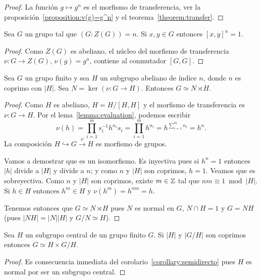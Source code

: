 \begin{proof}
	La función $g\mapsto g^n$ es el morfismo de transferencia, ver la
	proposición~\ref{proposition:v(g)=g^n} y el teorema~\ref{theorem:transfer}.
\end{proof}

\begin{corollary}
	\label{corollary:[x,y]^n=1}
	Sea $G$ un grupo tal que $(G:Z(G))=n$. Si $x,y\in G$ entonces $[x,y]^n=1$. 
\end{corollary}

\begin{proof}
	Como $Z(G)$ es abeliano, el núcleo del morfismo de transferencia $\nu\colon
	G\to Z(G)$, $\nu(g)=g^n$, contiene al conmutador $[G,G]$.
\end{proof}

\begin{corollary}
	\label{corollary:semidirecto}
	Sea $G$ un grupo finito y sea $H$ un subgrupo abeliano de
	índice $n$, donde $n$ es coprimo con $|H|$.  Sea
	$N=\ker(\nu\colon G\to H)$. Entonces $G\simeq N\rtimes H$.
\end{corollary}

\begin{proof}
	Como $H$ es abeliano, $H=H/[H,H]$ y el morfismo de transferencia es
	$\nu\colon G\to H$. Por el lema~\ref{lemma:evaluation}, podemos escribir
	\[
		\nu(h)
		=\prod_{i=1}^m s_i^{-1}h^{n_i}s_i
		=\prod_{i=1}^m h^{n_i}
		=h^{\sum_{i=1}^m n_i}=h^n.
	\]
	La composición $H\hookrightarrow G\xrightarrow{\nu} H$ es morfismo de
	grupos. 
	
	Vamos a demostrar que es un isomorfismo. Es inyectiva pues si $h^n=1$
	entonces $|h|$ divide a $|H|$ y divide a $n$; y como $n$ y $|H|$ son
	coprimos, $h=1$. Veamos que es sobreyectiva. Como $n$ y $|H|$ son coprimos,
	existe $m\in\mathbb{Z}$ tal que $nm\equiv 1\bmod |H|$. Si $h\in H$ entonces $h^m\in
	H$ y $\nu(h^m)=h^{nm}=h$. 

	Tenemos entonces que $G\simeq N\rtimes H$ pues $N$ es normal en $G$, $N\cap
	H=1$ y $G=NH$ (pues $|NH|=|N||H|$ y $G/N\simeq H$).
\end{proof}

\begin{corollary}[Frobenius]
	Sea $H$ un subgrupo central de un grupo finito $G$. Si $|H|$
	y $|G/H|$ son coprimos entonces $G\simeq H\times G/H$.
\end{corollary}

\begin{proof}
	Es consecuencia inmediata del corolario~\ref{corollary:semidirecto} pues
	$H$ es normal por ser un subgrupo central.
\end{proof}

